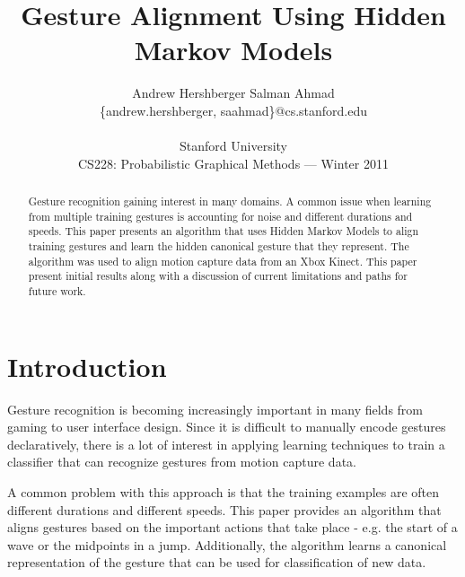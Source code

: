 \documentclass{article}
\title{Gesture Alignment Using Hidden Markov Models}
\author{
Andrew Hershberger
\quad Salman Ahmad \\
\{andrew.hershberger, saahmad\}@cs.stanford.edu
\\\\
Stanford University\\
CS228: Probabilistic Graphical Methods --- Winter 2011\\
}
\begin{document}
\maketitle

\begin{abstract}

Gesture recognition gaining interest in many domains. A common issue when
learning from multiple training gestures is accounting for noise and different
durations and speeds. This paper presents an algorithm that uses Hidden Markov
Models to align training gestures and learn the hidden canonical gesture that
they represent. The algorithm was used to align motion capture data from an
Xbox Kinect. This paper present initial results along with a discussion of
current limitations and paths for future work.

\end{abstract}

\section{Introduction}

Gesture recognition is becoming increasingly important in many fields from
gaming to user interface design. Since it is difficult to manually encode
gestures declaratively, there is a lot of interest in applying learning
techniques to train a classifier that can recognize gestures from motion
capture data.

A common problem with this approach is that the training examples are often
different durations and different speeds. This paper provides an algorithm
that aligns gestures based on the important actions that take place - e.g. the
start of a wave or the midpoints in a jump. Additionally, the algorithm
learns a canonical representation of the gesture that can be used for
classification of new data.
\end{document}
